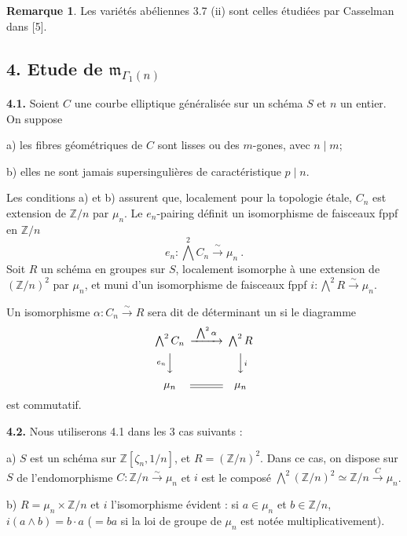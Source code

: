 \documentclass[10pt,a4paper]{amsart}
\theoremstyle{plain}
\theoremstyle{definition}
\newtheorem{remark}[theorem]{Remarque}
\newcommand{\m}{\mathfrak{m}}
\newcommand{\ZZ}{\mathbb{Z}}
\begin{document}
\begin{remark}
Les vari\'et\'es ab\'eliennes 3.7 (ii) sont celles \'etudi\'ees par Casselman dans [5].
\end{remark}


\subsection*{4. Etude de $\m_{\Gamma_1(n)}$}

\setcounter{theorem}{0}
\setcounter{subsection}{3}
\setcounter{theorem}{0}

\medskip\noindent\textbf{4.1.} Soient $C$ une courbe elliptique g\'en\'eralis\'ee sur un sch\'ema $S$ et $n$ un entier. On suppose

a) les fibres g\'eom\'etriques de $C$ sont lisses ou des $m$-gones, avec $n \mid m$;

b) elles ne sont jamais supersinguli\`eres de caract\'eristique $p \mid n$.

Les conditions a) et b) assurent que, localement pour la topologie \'etale, $C_n$ est extension de $\ZZ/n$ par $\mu_n$. Le $e_n$-pairing d\'efinit un isomorphisme de faisceaux fppf en $\ZZ/n$
\[
e_n : \bigwedge^2 C_n \xrightarrow{\;\sim\;} \mu_n\ .
\]
Soit $R$ un sch\'ema en groupes sur $S$, localement isomorphe \`a une extension de $(\ZZ/n)^2$ par $\mu_n$, et muni d'un isomorphisme de faisceaux fppf $i : \bigwedge^2 R \xrightarrow{\sim} \mu_n$.

Un isomorphisme $\alpha : C_n \xrightarrow{\sim} R$ sera dit de d\'eterminant un si le diagramme
\[
\begin{CD}
\bigwedge^2 C_n @>{\bigwedge^2 \alpha}>> \bigwedge^2 R \\
@V{e_n}VV @VV{i}V \\
\mu_n @= \mu_n
\end{CD}
\]
est commutatif.

\medskip\noindent\textbf{4.2.} Nous utiliserons 4.1 dans les 3 cas suivants :

a) $S$ est un sch\'ema sur $\ZZ[\zeta_n, 1/n]$, et $R = (\ZZ/n)^2$. Dans ce cas, on dispose sur $S$ de l'endomorphisme $C : \ZZ/n \xrightarrow{\sim} \mu_n$ et $i$ est le compos\'e $\bigwedge^2 (\ZZ/n)^2 \simeq \ZZ/n \xrightarrow{C} \mu_n$.

b) $R = \mu_n \times \ZZ/n$ et $i$ l'isomorphisme \'evident : si $a \in \mu_n$ et $b \in \ZZ/n$, $i(a \wedge b) = b \cdot a$ ($= ba$ si la loi de groupe de $\mu_n$ est not\'ee multiplicativement).
\end{document}
